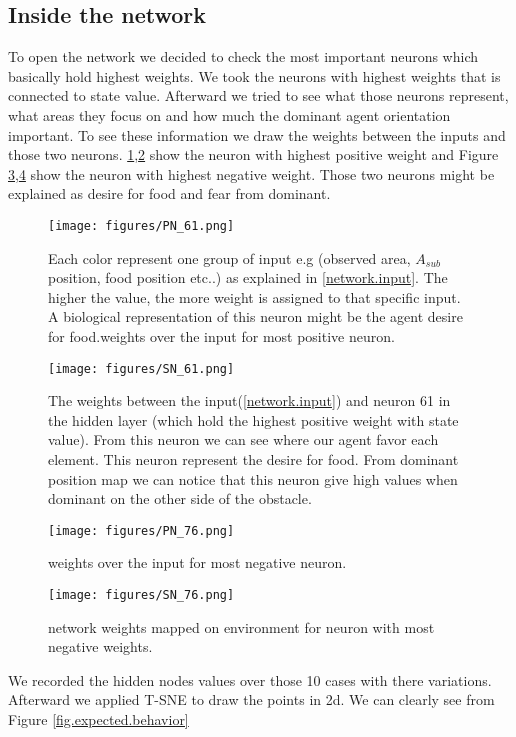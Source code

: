 \documentclass{article}
\begin{document}
\subsection{Inside the network}
To open the network we decided to check the most important neurons which basically hold highest weights. We took the neurons with highest weights that is connected to state value. Afterward we tried to see what those neurons represent, what areas they focus on and how much the dominant agent orientation important. To see these information we draw the weights between the inputs and those two neurons. \ref{fig.PN_61},\ref{fig.SN_61} show the neuron with highest positive weight and Figure \ref{fig.PN_76},\ref{fig.SN_76} show the neuron with highest negative weight. Those two neurons might be explained as desire for food and fear from dominant. 
\begin{figure}[H]
\texttt{[image: figures/PN\_61.png]}
\caption{Each color represent one group of input e.g (observed area, \(A_{sub}\) position, food position etc..) as explained in \ref{network.input}. The higher the value, the more weight is assigned to that specific input. A biological representation of this neuron might be the agent desire for food.weights over the input for most positive neuron.}
\label{fig.PN_61}
\end{figure}
\begin{figure}[H]
\texttt{[image: figures/SN\_61.png]}
\caption{The weights between the input(\ref{network.input}) and neuron 61 in the hidden layer (which hold the highest positive weight with state value). From this neuron we can see where our agent favor each element. This neuron represent the desire for food. From dominant position map we can notice that this neuron give high values when dominant on the other side of the obstacle.}
\label{fig.SN_61}
\end{figure}
\begin{figure}[H]
\texttt{[image: figures/PN\_76.png]}
\caption{weights over the input for most negative neuron.}
\label{fig.PN_76}
\end{figure}
\begin{figure}[H]
\texttt{[image: figures/SN\_76.png]}
\caption{network weights mapped on environment for neuron with most negative weights.}
\label{fig.SN_76}
\end{figure}
We recorded the hidden nodes values over those 10 cases with there variations. Afterward we applied T-SNE to draw the points in 2d. We can clearly see from Figure \ref{fig.expected.behavior}
\end{document}
